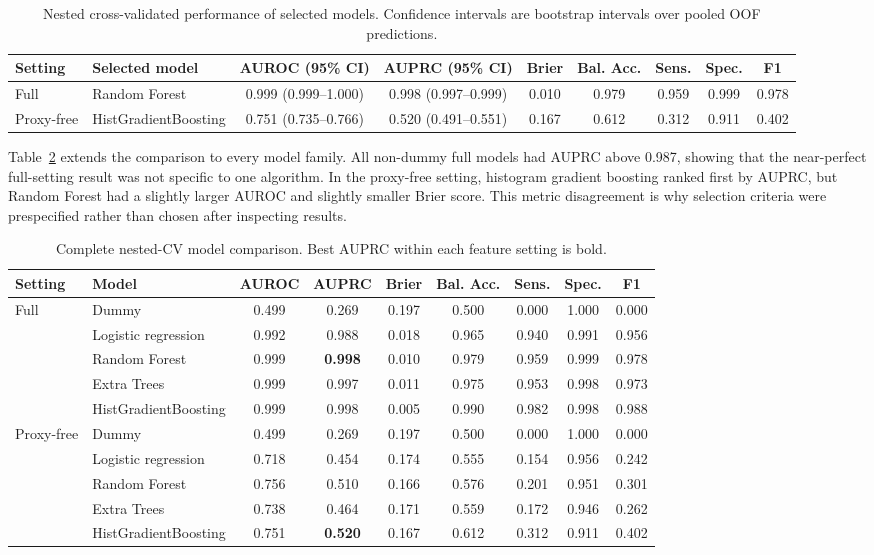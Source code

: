 \documentclass[conference]{IEEEtran}
\begin{document}
\begin{table}[t]
\centering
\caption{Nested cross-validated performance of selected models. Confidence intervals are bootstrap intervals over pooled OOF predictions.}
\label{tab:main}
\begin{tabular}{llccccccc}
\toprule
Setting & Selected model & AUROC (95\% CI) & AUPRC (95\% CI) & Brier & Bal. Acc. & Sens. & Spec. & F1 \\
\midrule
Full & Random Forest & 0.999 (0.999--1.000) & 0.998 (0.997--0.999) & 0.010 & 0.979 & 0.959 & 0.999 & 0.978 \\
Proxy-free & HistGradientBoosting & 0.751 (0.735--0.766) & 0.520 (0.491--0.551) & 0.167 & 0.612 & 0.312 & 0.911 & 0.402 \\
\bottomrule
\end{tabular}
\end{table}

Table~\ref{tab:allmodels} extends the comparison to every model family. All non-dummy full models had AUPRC above 0.987, showing that the near-perfect full-setting result was not specific to one algorithm. In the proxy-free setting, histogram gradient boosting ranked first by AUPRC, but Random Forest had a slightly larger AUROC and slightly smaller Brier score. This metric disagreement is why selection criteria were prespecified rather than chosen after inspecting results.

\begin{table}[t]
\centering
\caption{Complete nested-CV model comparison. Best AUPRC within each feature setting is bold.}
\label{tab:allmodels}
\begin{tabular}{llccccccc}
\toprule
Setting & Model & AUROC & AUPRC & Brier & Bal. Acc. & Sens. & Spec. & F1 \\
\midrule
\multirow{5}{*}{Full}
 & Dummy & 0.499 & 0.269 & 0.197 & 0.500 & 0.000 & 1.000 & 0.000 \\
 & Logistic regression & 0.992 & 0.988 & 0.018 & 0.965 & 0.940 & 0.991 & 0.956 \\
 & Random Forest & 0.999 & \textbf{0.998} & 0.010 & 0.979 & 0.959 & 0.999 & 0.978 \\
 & Extra Trees & 0.999 & 0.997 & 0.011 & 0.975 & 0.953 & 0.998 & 0.973 \\
 & HistGradientBoosting & 0.999 & 0.998 & 0.005 & 0.990 & 0.982 & 0.998 & 0.988 \\
\midrule
\multirow{5}{*}{Proxy-free}
 & Dummy & 0.499 & 0.269 & 0.197 & 0.500 & 0.000 & 1.000 & 0.000 \\
 & Logistic regression & 0.718 & 0.454 & 0.174 & 0.555 & 0.154 & 0.956 & 0.242 \\
 & Random Forest & 0.756 & 0.510 & 0.166 & 0.576 & 0.201 & 0.951 & 0.301 \\
 & Extra Trees & 0.738 & 0.464 & 0.171 & 0.559 & 0.172 & 0.946 & 0.262 \\
 & HistGradientBoosting & 0.751 & \textbf{0.520} & 0.167 & 0.612 & 0.312 & 0.911 & 0.402 \\
\bottomrule
\end{tabular}
\end{table}
\end{document}
